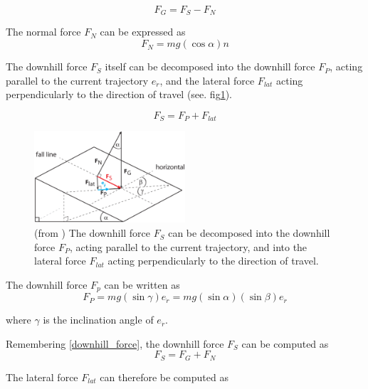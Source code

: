 \documentclass[12pt,a4paper,twoside]{book}
\begin{document}
\begin{equation}\label{downhill_force}
F_G=F_S-F_N
\end{equation}

The normal force $F_N$ can be expressed as
\begin{equation}
F_N=mg(\cos \alpha )n
\end{equation}

The downhill force $F_S$ itself can be decomposed into the downhill force $F_P$, acting parallel to the current trajectory $e_{\dot{r}}$, and the lateral force $F_{lat}$ acting perpendicularly to the direction of travel (see. fig\ref{downhill_force_pic}).

\begin{equation}
F_S=F_P+F_{lat}
\end{equation}

\begin{figure}[!ht]
  \begin{center}
    \includegraphics[width=0.5\textwidth]{images/figure5.eps}
    \caption{(from \cite{hol2012}) The downhill force $F_S$ can be decomposed into the downhill force $F_P$, acting parallel to the current trajectory, and into the lateral force $F_{lat}$ acting perpendicularly to the direction of travel.}\label{downhill_force_pic}
  \end{center}
\end{figure}

The downhill force $F_p$ can be written as
\begin{equation}
F_P=mg ( \sin \gamma ) e_{\dot{r}}=mg ( \sin \alpha ) ( \sin \beta ) e_{\dot{r}}
\end{equation}

where $\gamma$ is the inclination angle of $e_{\dot{r}}$.

Remembering \ref{downhill_force}, the downhill force $F_S$ can be computed as
\begin{equation}
F_S=F_G+F_N
\end{equation}

The lateral force $F_{lat}$ can therefore be computed as
\end{document}
